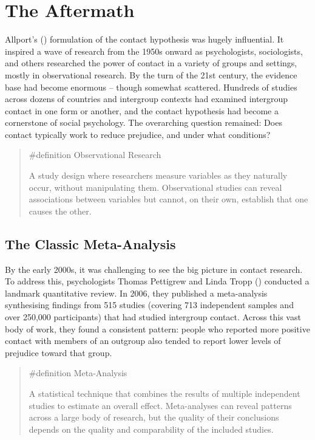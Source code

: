 \documentclass[
  letterpaper,
]{book}
\begin{document}
\section{The Aftermath}\label{the-aftermath-17}

Allport's () formulation of the contact
hypothesis was hugely influential. It inspired a wave of research from
the 1950s onward as psychologists, sociologists, and others researched
the power of contact in a variety of groups and settings, mostly in
observational research. By the turn of the 21st century, the evidence
base had become enormous -- though somewhat scattered. Hundreds of
studies across dozens of countries and intergroup contexts had examined
intergroup contact in one form or another, and the contact hypothesis
had become a cornerstone of social psychology. The overarching question
remained: Does contact typically work to reduce prejudice, and under
what conditions?

\begin{quote}
\label{def-observationalresearch}{\#definition}
Observational Research

A study design where researchers measure variables as they naturally
occur, without manipulating them. Observational studies can reveal
associations between variables but cannot, on their own, establish that
one causes the other.
\end{quote}

\subsection{The Classic Meta-Analysis}\label{the-classic-meta-analysis}

By the early 2000s, it was challenging to see the big picture in contact
research. To address this, psychologists Thomas Pettigrew and Linda
Tropp () conducted a landmark
quantitative review. In 2006, they published a meta-analysis
synthesising findings from 515 studies (covering 713 independent samples
and over 250,000 participants) that had studied intergroup contact.
Across this vast body of work, they found a consistent pattern: people
who reported more positive contact with members of an outgroup also
tended to report lower levels of prejudice toward that group.

\begin{quote}
\label{def-meta-analysis}{\#definition} Meta-Analysis

A statistical technique that combines the results of multiple
independent studies to estimate an overall effect. Meta-analyses can
reveal patterns across a large body of research, but the quality of
their conclusions depends on the quality and comparability of the
included studies.
\end{quote}
\end{document}
